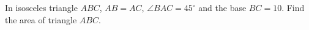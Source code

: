 In isosceles triangle $ABC$, $AB=AC$, $\angle BAC=45^\circ$ and the base $BC=10$. Find the area of triangle $ABC$.
